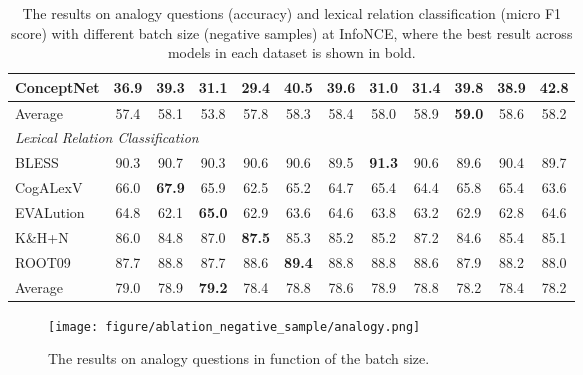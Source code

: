 \documentclass[3p]{elsarticle}
\begin{document}
{\begin{table}[!t]
\begin{tabular}{lccccccccccc}
ConceptNet        &  36.9 &           39.3 &           31.1 &           29.4 &           40.5 &           39.6 &           31.0 &           31.4 &           39.8 &           38.9 &  \textbf{42.8} \\
\midrule
Average & 57.4 &           58.1 &           53.8 &           57.8 &           58.3 &           58.4 &           58.0 &           58.9 &  \textbf{59.0} &           58.6 &           58.2 \\
\midrule
\multicolumn{4}{l}{\textit{Lexical Relation Classification}}                  \\
BLESS             &  90.3 &           90.7 &           90.3 &           90.6 &           90.6 &           89.5 &  \textbf{91.3} &           90.6 &           89.6 &           90.4 &           89.7 \\
CogALexV          &  66.0 &  \textbf{67.9} &           65.9 &           62.5 &           65.2 &           64.7 &           65.4 &           64.4 &           65.8 &           65.4 &           63.6 \\
EVALution         &  64.8 &           62.1 &  \textbf{65.0} &           62.9 &           63.6 &           64.6 &           63.8 &           63.2 &           62.9 &           62.8 &           64.6 \\
K\&H+N             &  86.0 &           84.8 &           87.0 &  \textbf{87.5} &           85.3 &           85.2 &           85.2 &           87.2 &           84.6 &           85.4 &           85.1 \\
ROOT09            &  87.7 &           88.8 &           87.7 &           88.6 &  \textbf{89.4} &           88.8 &           88.8 &           88.6 &           87.9 &           88.2 &           88.0 \\
\midrule
Average     &  79.0 &           78.9 &  \textbf{79.2} &           78.4 &           78.8 &           78.6 &           78.9 &           78.8 &           78.2 &           78.4 &           78.2 \\
\bottomrule
\end{tabular}
\caption{The results on analogy questions (accuracy) and lexical relation classification (micro F1 score) with different batch size (negative samples) at InfoNCE, where the best result across models in each dataset is shown in bold. }
\label{tab:result-loss-function-negative}
\end{table}

\begin{figure}[!t]
    \centering
    \texttt{[image: figure/ablation\_negative\_sample/analogy.png]}
    \caption{The results on analogy questions in function of the batch size. }
    \label{fig:relbert:negative-sample-ana}
\end{figure}

}
\end{document}
